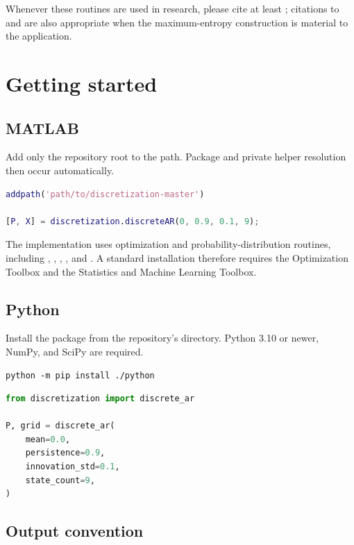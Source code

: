 Whenever these routines are used in research, please cite at least
\textcite{FarmerToda2017QE}; citations to \textcite{TanakaToda2013EL} and
\textcite{TanakaToda2015SINUM} are also appropriate when the
maximum-entropy construction is material to the application.

\section{Getting started}
\label{sec:getting-started}

\subsection{MATLAB}

Add only the repository root to the \matlab{} path. Package and private helper
resolution then occur automatically.

\begin{lstlisting}[language=Matlab]
addpath('path/to/discretization-master')

[P, X] = discretization.discreteAR(0, 0.9, 0.1, 9);
\end{lstlisting}

The implementation uses optimization and probability-distribution routines,
including , , , ,
and . A standard installation therefore requires the
Optimization Toolbox and the Statistics and Machine Learning Toolbox.

\subsection{Python}

Install the package from the repository's  directory. Python
3.10 or newer, NumPy, and SciPy are required.

\begin{lstlisting}
python -m pip install ./python
\end{lstlisting}

\begin{lstlisting}[language=Python]
from discretization import discrete_ar

P, grid = discrete_ar(
    mean=0.0,
    persistence=0.9,
    innovation_std=0.1,
    state_count=9,
)
\end{lstlisting}

\subsection{Output convention}

